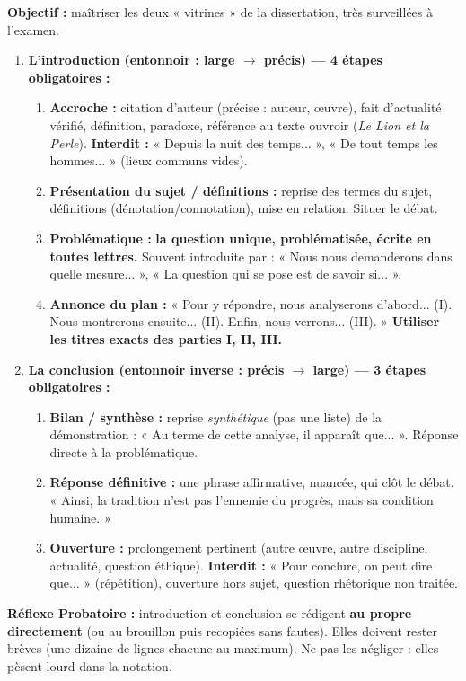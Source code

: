 \documentclass[11pt]{article}
\begin{document}
\begin{methode}
    \textbf{Objectif :} maîtriser les deux « vitrines » de la dissertation, très surveillées à l'examen.
    \begin{enumerate}
        \item \textbf{L'introduction (entonnoir : large $\rightarrow$ précis) — 4 étapes obligatoires :}
            \begin{enumerate}
                \item \textbf{Accroche :} citation d'auteur (précise : auteur, œuvre), fait d'actualité vérifié, définition, paradoxe, référence au texte ouvroir (\emph{Le Lion et la Perle}). \textbf{Interdit :} « Depuis la nuit des temps... », « De tout temps les hommes... » (lieux communs vides).
                \item \textbf{Présentation du sujet / définitions :} reprise des termes du sujet, définitions (dénotation/connotation), mise en relation. Situer le débat.
                \item \textbf{Problématique :} \textbf{la question unique, problématisée, écrite en toutes lettres.} Souvent introduite par : « Nous nous demanderons dans quelle mesure... », « La question qui se pose est de savoir si... ».
                \item \textbf{Annonce du plan :} « Pour y répondre, nous analyserons d'abord... (I). Nous montrerons ensuite... (II). Enfin, nous verrons... (III). » \textbf{Utiliser les titres exacts des parties I, II, III.}
            \end{enumerate}
        \item \textbf{La conclusion (entonnoir inverse : précis $\rightarrow$ large) — 3 étapes obligatoires :}
            \begin{enumerate}
                \item \textbf{Bilan / synthèse :} reprise \emph{synthétique} (pas une liste) de la démonstration : « Au terme de cette analyse, il apparaît que... ». Réponse directe à la problématique.
                \item \textbf{Réponse définitive :} une phrase affirmative, nuancée, qui clôt le débat. « Ainsi, la tradition n'est pas l'ennemie du progrès, mais sa condition humaine. »
                \item \textbf{Ouverture :} prolongement pertinent (autre œuvre, autre discipline, actualité, question éthique). \textbf{Interdit :} « Pour conclure, on peut dire que... » (répétition), ouverture hors sujet, question rhétorique non traitée.
            \end{enumerate}
    \end{enumerate}
    \textbf{Réflexe Probatoire :} introduction et conclusion se rédigent \textbf{au propre directement} (ou au brouillon puis recopiées sans fautes). Elles doivent rester brèves (une dizaine de lignes chacune au maximum). Ne pas les négliger : elles pèsent lourd dans la notation.
\end{methode}
\end{document}

